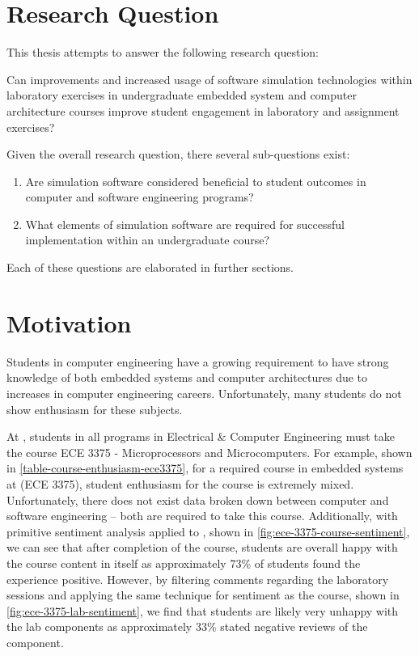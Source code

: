 \section{Research Question}

This thesis attempts to answer the following research question:
\begin{displayquote}
Can improvements and increased usage of software simulation technologies within laboratory exercises in undergraduate embedded system and computer architecture courses improve student engagement in laboratory and assignment exercises?
\end{displayquote}
Given the overall research question, there several sub-questions exist: 
\begin{enumerate}
	\item Are simulation software considered beneficial to student outcomes in computer and software engineering programs?
	\item What elements of simulation software are required for successful implementation within an undergraduate course?
\end{enumerate}
Each of these questions are elaborated in further sections. 

\section{Motivation}
\label{sec:motivation}

Students in computer engineering have a growing requirement to have strong knowledge of both embedded systems and computer architectures due to increases in computer engineering careers\cite{cec2016, bls2014}. Unfortunately, many students do not show enthusiasm for these subjects. 

At \uwo{}, students in all programs in Electrical \& Computer Engineering must take the course ECE 3375 - Microprocessors and Microcomputers\cite{uwo-we-programprogression, eceoutline-ece3375}. For example, shown in \cref{table-course-enthusiasm-ece3375}, for a required course in embedded systems at \uwo{} (ECE 3375)\cite{eceOutlines}, student enthusiasm for the course is extremely mixed. Unfortunately, there does not exist data broken down between computer and software engineering -- both are required to take this course. Additionally, with primitive sentiment analysis applied to \cite{evals:ece3375-2013, evals:ece3375-2014}, shown in \cref{fig:ece-3375-course-sentiment}, we can see that after completion of the course, students are overall happy with the course content in itself as approximately 73\% of students found the experience positive. However, by filtering comments regarding the laboratory sessions and applying the same technique for sentiment as the course, shown in \cref{fig:ece-3375-lab-sentiment}, we find that students are likely very unhappy with the lab components as approximately 33\% stated negative reviews of the component. 

